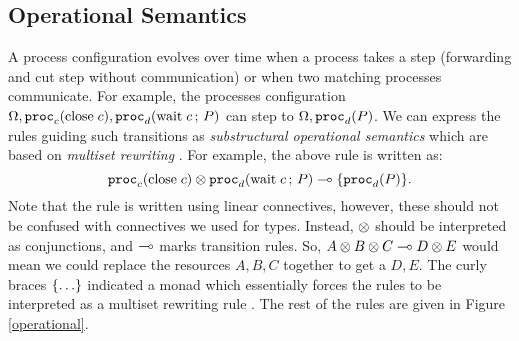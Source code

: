 \documentclass[a4paper,USenglish]{lipics-v2016}
\begin{document}
\subsection{Operational Semantics}

A process configuration evolves over time when a process takes a step (forwarding and cut step without communication) or when two matching processes communicate. For example, the processes configuration $\Omega, \mathtt{proc}_{c}(\mathrm{close}\;c), \mathtt{proc}_{d}(\mathrm{wait}\;c \,;\, P)$ can step to $\Omega, \mathtt{proc}_{d}(P)$. We can express the rules guiding such transitions as \emph{substructural operational semantics} \cite{Simmons12} which are based on \emph{multiset rewriting} \cite{Cervesato06}. For example, the above rule is written as:
$$ \mathtt{proc}_{c}(\mathrm{close}\;c) \otimes \mathtt{proc}_{d}(\mathrm{wait}\;c \,;\, P) \multimap \lbrace\mathtt{proc}_{d}(P)\rbrace. $$
Note that the rule is written using linear connectives, however, these should not be confused with connectives we used for types. Instead, $\otimes$ should be interpreted as conjunctions, and $\multimap$ marks transition rules. So, $A \otimes B \otimes C \multimap D \otimes E$ would mean we could replace the resources $A, B, C$ together to get a $D, E$. The curly braces $\lbrace\ldots\rbrace$ indicated a monad which essentially forces the rules to be interpreted as a multiset rewriting rule . The rest of the rules are given in Figure \ref{operational}.
\end{document}
